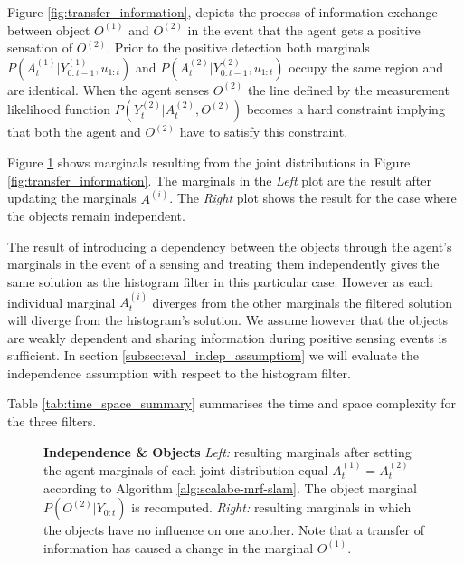 Figure \ref{fig:transfer_information}, depicts the process of information exchange between object $O^{(1)}$ and $O^{(2)}$ in the event that the agent 
gets a positive sensation of $O^{(2)}$. Prior to the positive detection both marginals $P(A^{(1)}_t|Y^{(1)}_{0:t-1},u_{1:t})$ and $P(A^{(2)}_t|Y^{(2)}_{0:t-1},u_{1:t})$ 
occupy the same region and are identical. When the agent senses $O^{(2)}$ the line defined by the measurement 
likelihood function $P(Y^{(2)}_t|A^{(2)}_t,O^{(2)})$ becomes a hard constraint implying that both the agent and $O^{(2)}$ have to satisfy this constraint.

Figure \ref{fig:independence_object} shows marginals resulting from the joint distributions in Figure \ref{fig:transfer_information}. The marginals in
the \textit{Left} plot are the result after updating the marginals $A^{(i)}$. The \textit{Right} plot shows the result for the case where the objects
remain independent. 

The result of introducing a dependency between the objects through the agent's marginals in the event of a sensing and treating them
independently gives the same solution as the histogram filter in this particular case. However as each individual marginal $A^{(i)}_t$ diverges 
from the other marginals the filtered solution will diverge from the histogram's solution. We assume however that the objects are weakly 
dependent and sharing information during positive sensing events is sufficient. In section \ref{subsec:eval_indep_assumptiom} we will 
evaluate the independence assumption with respect to the histogram filter.

Table \ref{tab:time_space_summary} summarises the time and space complexity for the three filters.%

\begin{figure}
  \centering
  \caption{\textbf{Independence \& Objects} \textit{Left:} resulting marginals after setting the agent marginals of each 
  joint distribution equal $A^{(1)}_t = A^{(2)}_t$ according to Algorithm \ref{alg:scalabe-mrf-slam}. The object marginal $P(O^{(2)}|Y_{0:t})$ is recomputed. 
  \textit{Right:} resulting marginals in which the objects have no influence on one another.
  Note that a transfer of information has caused a change in the marginal $O^{(1)}$.}
  \label{fig:independence_object}
\end{figure}


